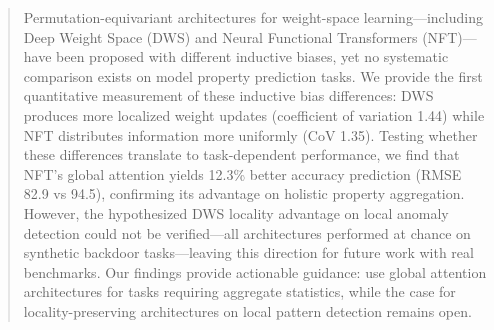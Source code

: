 \begin{abstract}
Permutation-equivariant architectures for weight-space learning---including Deep Weight Space (DWS) and Neural Functional Transformers (NFT)---have been proposed with different inductive biases, yet no systematic comparison exists on model property prediction tasks. We provide the first quantitative measurement of these inductive bias differences: DWS produces more localized weight updates (coefficient of variation 1.44) while NFT distributes information more uniformly (CoV 1.35). Testing whether these differences translate to task-dependent performance, we find that NFT's global attention yields 12.3\% better accuracy prediction (RMSE 82.9 vs 94.5), confirming its advantage on holistic property aggregation. However, the hypothesized DWS locality advantage on local anomaly detection could not be verified---all architectures performed at chance on synthetic backdoor tasks---leaving this direction for future work with real benchmarks. Our findings provide actionable guidance: use global attention architectures for tasks requiring aggregate statistics, while the case for locality-preserving architectures on local pattern detection remains open.
\end{abstract}
